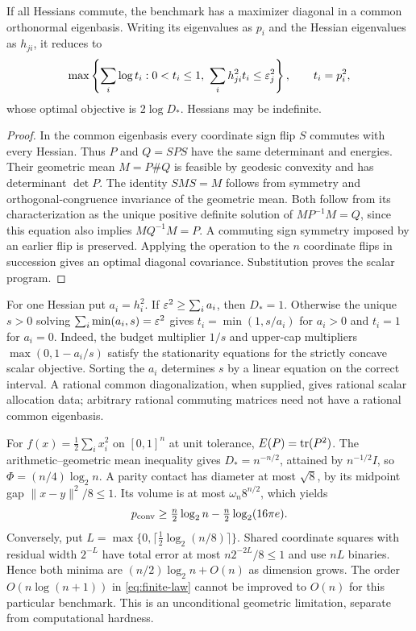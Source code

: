 \begin{proposition}\label{prop:commuting-covariance}
If all Hessians commute, the benchmark has a maximizer diagonal in a
common orthonormal eigenbasis. Writing its eigenvalues as $p_i$ and the
Hessian eigenvalues as $h_{ji}$, it reduces to
\[
 \max\left\{\sum_i\log t_i:0<t_i\le1,
                   \ \sum_i h_{ji}^2t_i\le\varepsilon_j^2\right\},
 \qquad t_i=p_i^2,
\]
whose optimal objective is $2\log D_*$. Hessians may be indefinite.
\end{proposition}
\begin{proof}
In the common eigenbasis every coordinate sign flip $S$ commutes with
every Hessian. Thus $P$ and $Q=SPS$ have the same determinant and
energies. Their geometric mean $M=P\#Q$ is feasible by geodesic
convexity and has determinant $\det P$. The identity $SMS=M$ follows
from symmetry and orthogonal-congruence invariance of the geometric
mean. Both follow from its characterization as the unique positive
definite solution of $MP^{-1}M=Q$, since this equation also implies
$MQ^{-1}M=P$. A commuting sign symmetry imposed by an earlier flip is
preserved. Applying the operation to the $n$ coordinate flips in
succession gives an optimal diagonal covariance. Substitution proves the
scalar program.
\end{proof}

For one Hessian put $a_i=h_i^2$. If $\varepsilon^2\ge\sum_i a_i$, then
$D_*=1$. Otherwise the unique $s>0$ solving
$\sum_i\min(a_i,s)=\varepsilon^2$ gives
$t_i=\min(1,s/a_i)$ for $a_i>0$ and $t_i=1$ for $a_i=0$.
Indeed, the budget multiplier $1/s$ and upper-cap multipliers
$\max(0,1-a_i/s)$ satisfy the stationarity equations for the strictly
concave scalar objective. Sorting the $a_i$ determines $s$ by a linear
equation on the correct interval. A rational common diagonalization,
when supplied, gives rational scalar allocation data; arbitrary rational
commuting matrices need not have a rational common eigenbasis.

\begin{example}\label{ex:covariance-gap}
For $f(x)=\frac12\sum_i x_i^2$ on $[0,1]^n$ at unit tolerance,
$E(P)=\operatorname{tr}(P^2)$. The arithmetic--geometric mean inequality gives
$D_*=n^{-n/2}$, attained by $n^{-1/2}I$, so
$\Phi=(n/4)\log_2n$. A parity contact has diameter at most $\sqrt8$,
by its midpoint gap $\|x-y\|^2/8\le1$. Its volume is at most
$\omega_n8^{n/2}$, which yields
\[
 p_{\mathrm{conv}}\ge\tfrac n2\log_2n-\tfrac n2\log_2(16\pi e).
\]
Conversely, put $L=\max\{0,\lceil\frac12\log_2(n/8)\rceil\}$.
Shared coordinate squares with residual width $2^{-L}$ have total
error at most $n2^{-2L}/8\le1$ and use $nL$ binaries. Hence both
minima are $(n/2)\log_2n+O(n)$ as dimension grows. The order
$O(n\log(n+1))$ in \eqref{eq:finite-law} cannot be improved to $O(n)$
for this particular benchmark. This is an unconditional geometric
limitation, separate from computational hardness.
\end{example}

